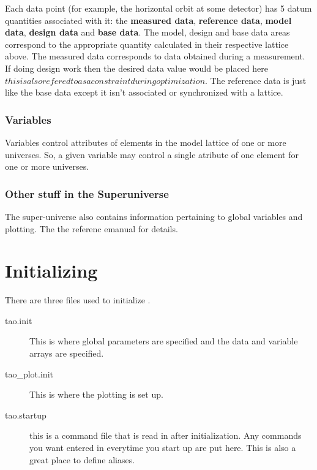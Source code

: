 \documentclass{book}
\begin{document}
Each data point (for example, the horizontal orbit at some detector) has 5 datum
 quantities associated with it: the \textbf{measured data}, \textbf{reference
data}, \textbf{model data}, \textbf{design data} and \textbf{base data}. The
model, design and base data areas correspond to the appropriate quantity
calculated in their respective lattice above. The measured data corresponds to 
data obtained during a measurement. If doing design work then the desired data
value would be placed here \( this is also refered to as a constraint during
optimization\). The reference data is just like the base data except it isn't
associated or synchronized with a lattice.

\subsection{Variables}

Variables control attributes of elements in the model lattice of one or more
universes. So, a given variable may control a single atribute of one element
for one or more universes. 

\subsection{Other stuff in the Superuniverse}

The super-universe also contains information pertaining to global variables and
plotting. The the \tao referenc emanual for details.

\chapter{Initializing \tao}
\label{c:initializing}

There are three files used to initialize \tao.
  \vspace*{-3ex}
\begin{description}
  \item[tao.init] \Newline 
    This is where global parameters are specified and the data and variable
arrays are specified.
  \item[tao\_plot.init] \Newline
    This is where the plotting is set up.
  \item[tao.startup] \Newline
    this is a command file that is read in after initialization. Any commands you
want entered in \tao everytime you start up are put here. This is also a great
place to define aliases.
\end{description}
\end{document}
